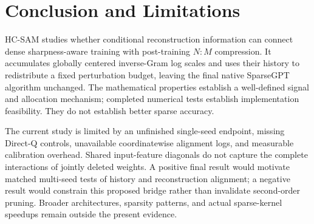 \section{Conclusion and Limitations}
HC-SAM studies whether conditional reconstruction information can connect dense sharpness-aware training with post-training $N{:}M$ compression. It accumulates globally centered inverse-Gram log scales and uses their history to redistribute a fixed perturbation budget, leaving the final native SparseGPT algorithm unchanged. The mathematical properties establish a well-defined signal and allocation mechanism; completed numerical tests establish implementation feasibility. They do not establish better sparse accuracy.

The current study is limited by an unfinished single-seed endpoint, missing Direct-Q controls, unavailable coordinatewise alignment logs, and measurable calibration overhead. Shared input-feature diagonals do not capture the complete interactions of jointly deleted weights. A positive final result would motivate matched multi-seed tests of history and reconstruction alignment; a negative result would constrain this proposed bridge rather than invalidate second-order pruning. Broader architectures, sparsity patterns, and actual sparse-kernel speedups remain outside the present evidence.
